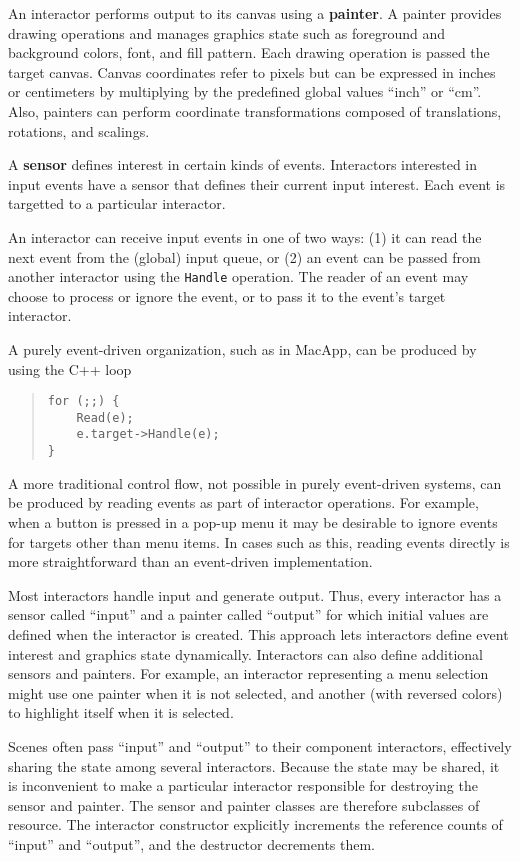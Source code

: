 An interactor performs output to its canvas using a {\bf painter}.
A painter provides drawing operations and manages graphics state
such as foreground and background colors, font, and fill pattern.
Each drawing operation is passed the target canvas.
Canvas coordinates refer to pixels but
can be expressed in inches or centimeters
by multiplying by the predefined global values ``inch'' or ``cm''.
Also, painters can perform coordinate transformations
composed of translations, rotations, and scalings.

A {\bf sensor} defines interest in certain kinds of events.
Interactors interested in input events
have a sensor that defines their current input interest.
Each event is targetted to a particular interactor.

An interactor can receive input events in one of two ways:
(1) it can read the next event from the (global) input queue, or
(2) an event can be passed from another interactor
using the {\tt Handle} operation.
The reader of an event may choose to process or ignore the event, or to pass
it to the event's target interactor.

A purely event-driven organization, such as in MacApp,
can be produced by using the C++ loop
\nopagebreak
\begin{quote}
\small
\begin{verbatim}
for (;;) {
    Read(e);
    e.target->Handle(e);
}
\end{verbatim}
\end{quote}


A more traditional control flow, not possible
in purely event-driven systems, can be produced by reading events
as part of interactor operations.
For example, when a button is pressed in a pop-up menu
it may be desirable
to ignore events for targets other than menu items.
In cases such as this, reading events directly
is more straightforward than an event-driven implementation.

Most interactors handle input and generate output.
Thus, every interactor has a sensor
called ``input'' and a painter called ``output''
for which initial values are defined when
the interactor is created.
This approach lets interactors define event interest and
graphics state dynamically.
Interactors can also define additional sensors and painters.
For example, an interactor representing a menu selection
might use one painter when it is not selected, and another (with reversed
colors) to highlight itself when it is selected.

Scenes often pass ``input'' and ``output'' to their component interactors,
effectively sharing the state among several interactors.
Because the state may be shared, it is inconvenient to make
a particular interactor responsible for destroying
the sensor and painter.
The sensor and painter classes are therefore subclasses
of resource.  The interactor constructor explicitly increments
the reference counts of ``input'' and ``output'',
and the destructor decrements them.

